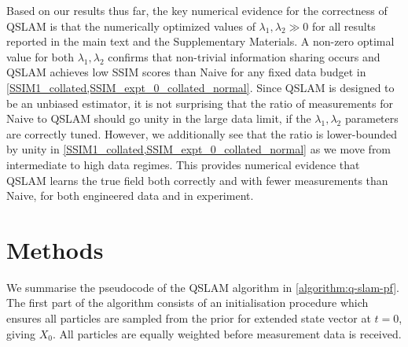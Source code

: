\documentclass[reprint,longbibliography]{revtex4-1} %
\begin{document}
Based on our results thus far, the key numerical evidence for the correctness of QSLAM is that the numerically optimized values of $\lambda_1, \lambda_2 \gg 0 $ for all results reported in the main text and the Supplementary Materials. A non-zero optimal value for both  $\lambda_1, \lambda_2$  confirms that non-trivial information sharing occurs and QSLAM achieves low SSIM scores than Naive for any fixed data budget in \cref{SSIM1_collated,SSIM_expt_0_collated_normal}. Since QSLAM is designed to be an unbiased estimator, it is not surprising that the ratio of measurements for Naive to QSLAM  should go unity in the large data limit, if the $\lambda_1, \lambda_2$ parameters are correctly tuned. However, we additionally see that the ratio is lower-bounded by unity in \cref{SSIM1_collated,SSIM_expt_0_collated_normal} as we move from intermediate to high data regimes. This provides numerical evidence that QSLAM learns the true field both correctly and with fewer measurements than Naive, for both engineered data and in experiment. 

\FloatBarrier
\section{Methods}

We summarise the pseudocode of the QSLAM algorithm in \cref{algorithm:q-slam-pf}. The first part of the algorithm consists of an initialisation procedure which ensures all particles are sampled from the prior for extended state vector at $t=0$, giving $X_0$. All particles are equally weighted before measurement data is received. 
\end{document}
